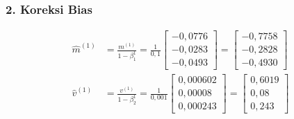 \documentclass[11pt,a4paper]{article}
\def\mathbf#1{#1}%
\begin{document}
\subsubsection*{2. Koreksi Bias}
\begin{align}
\hat{\mathbf{m}}^{(1)} &= \frac{\mathbf{m}^{(1)}}{1 - \beta_1^1} = \frac{1}{0{,}1} \begin{bmatrix} -0{,}0776 \\ -0{,}0283 \\ -0{,}0493 \end{bmatrix} = \begin{bmatrix} -0{,}7758 \\ -0{,}2828 \\ -0{,}4930 \end{bmatrix} \\
\hat{\mathbf{v}}^{(1)} &= \frac{\mathbf{v}^{(1)}}{1 - \beta_2^1} = \frac{1}{0{,}001} \begin{bmatrix} 0{,}000602 \\ 0{,}00008 \\ 0{,}000243 \end{bmatrix} = \begin{bmatrix} 0{,}6019 \\ 0{,}08 \\ 0{,}243 \end{bmatrix}
\end{align}
\end{document}

